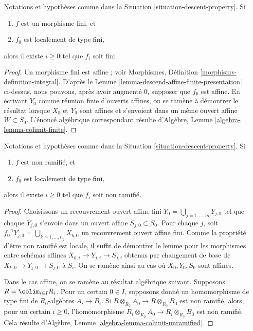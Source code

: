 \begin{lemma}
\label{lemma-descend-finite-finite-presentation}
Notations et hypothèses comme dans la
Situation \ref{situation-descent-property}. Si
\begin{enumerate}
\item $f$ est un morphisme fini, et
\item $f_0$ est localement de type fini,
\end{enumerate}
alors il existe $i \geq 0$ tel que $f_i$ soit fini.
\end{lemma}

\begin{proof}
Un morphisme fini est affine ; voir Morphismes,
Définition \ref{morphisms-definition-integral}. D'après le
Lemme \ref{lemma-descend-affine-finite-presentation} ci-dessus, nous pouvons,
après avoir augmenté $0$, supposer que $f_0$ est affine. En écrivant $Y_0$
comme réunion finie d'ouverts affines, on se ramène à démontrer le résultat
lorsque $X_0$ et $Y_0$ sont affines et s'envoient dans un même ouvert affine
$W \subset S_0$. L'énoncé algébrique correspondant résulte d'Algèbre,
Lemme \ref{algebra-lemma-colimit-finite}.
\end{proof}

\begin{lemma}
\label{lemma-descend-unramified}
Notations et hypothèses comme dans la
Situation \ref{situation-descent-property}. Si
\begin{enumerate}
\item $f$ est non ramifié, et
\item $f_0$ est localement de type fini,
\end{enumerate}
alors il existe $i \geq 0$ tel que $f_i$ soit non ramifié.
\end{lemma}

\begin{proof}
Choisissons un recouvrement ouvert affine fini
$Y_0 = \bigcup_{j = 1, \ldots, m} Y_{j, 0}$ tel que chaque $Y_{j, 0}$
s'envoie dans un ouvert affine $S_{j, 0} \subset S_0$. Pour chaque $j$, soit
$f_0^{-1}Y_{j, 0} = \bigcup_{k = 1, \ldots, n_j} X_{k, 0}$ un recouvrement
ouvert affine fini. Comme la propriété d'être non ramifié est locale, il
suffit de démontrer le lemme pour les morphismes entre schémas affines
$X_{k, i} \to Y_{j, i} \to S_{j, i}$ obtenus par changement de base
de $X_{k, 0} \to Y_{j, 0} \to S_{j, 0}$ à $S_i$. On se ramène ainsi au cas où
$X_0, Y_0, S_0$ sont affines.

\medskip\noindent
Dans le cas affine, on se ramène au résultat algébrique suivant. Supposons
$R = \colim_{i \in I} R_i$. Pour un certain $0 \in I$, supposons donné un
homomorphisme de type fini de $R_0$-algèbres $A_i \to B_i$. Si
$R \otimes_{R_0} A_0 \to R \otimes_{R_0} B_0$ est non ramifié, alors, pour
un certain $i \geq 0$, l'homomorphisme
$R_i \otimes_{R_0} A_0 \to R_i \otimes_{R_0} B_0$ est non ramifié. Cela
résulte d'Algèbre, Lemme \ref{algebra-lemma-colimit-unramified}.
\end{proof}

